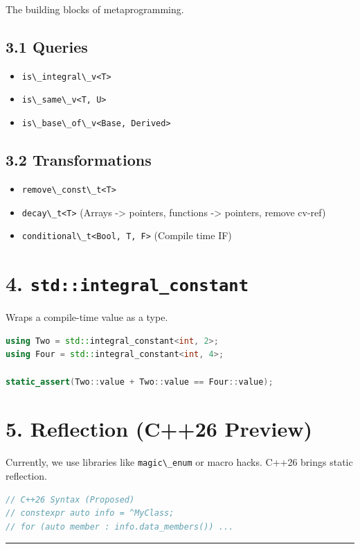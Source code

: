The building blocks of metaprogramming.

\hypertarget{queries}{%
\subsection{3.1 Queries}\label{queries}}

\begin{itemize}
\tightlist
\item
  \passthrough{\lstinline!is\_integral\_v<T>!}
\item
  \passthrough{\lstinline!is\_same\_v<T, U>!}
\item
  \passthrough{\lstinline!is\_base\_of\_v<Base, Derived>!}
\end{itemize}

\hypertarget{transformations}{%
\subsection{3.2 Transformations}\label{transformations}}

\begin{itemize}
\tightlist
\item
  \passthrough{\lstinline!remove\_const\_t<T>!}
\item
  \passthrough{\lstinline!decay\_t<T>!} (Arrays -\textgreater{}
  pointers, functions -\textgreater{} pointers, remove cv-ref)
\item
  \passthrough{\lstinline!conditional\_t<Bool, T, F>!} (Compile time IF)
\end{itemize}

\hypertarget{stdintegral_constant}{%
\section{\texorpdfstring{4.
\texttt{std::integral\_constant}}{4. std::integral\_constant}}\label{stdintegral_constant}}

Wraps a compile-time value as a type.

\begin{lstlisting}[language={C++}]
using Two = std::integral_constant<int, 2>;
using Four = std::integral_constant<int, 4>;

static_assert(Two::value + Two::value == Four::value);
\end{lstlisting}

\hypertarget{reflection-c26-preview}{%
\section{5. Reflection (C++26 Preview)}\label{reflection-c26-preview}}

Currently, we use libraries like \passthrough{\lstinline!magic\_enum!}
or macro hacks. C++26 brings static reflection.

\begin{lstlisting}[language={C++}]
// C++26 Syntax (Proposed)
// constexpr auto info = ^MyClass;
// for (auto member : info.data_members()) ...
\end{lstlisting}

\begin{center}\rule{0.5\linewidth}{0.5pt}\end{center}
